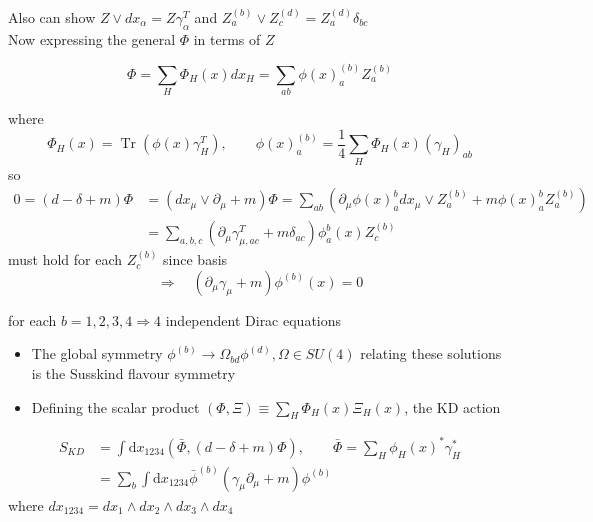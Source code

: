 Also can show \(Z \vee d x_{\alpha}=Z \gamma_{\alpha}^{T}\) and \(Z_{a}^{(b)} \vee Z_{c}^{(d)}=Z_{a}^{(d)} \delta_{b c}\)\\
Now expressing the general \(\Phi\) in terms of \(Z\)

\begin{equation}
\Phi=\sum_{H} \Phi_{H}(x) d x_{H}=\sum_{a b} \phi(x)_{a}^{(b)} Z_{a}^{(b)}
\end{equation}

where
\begin{equation}
    \Phi_{H}(x)=\operatorname{Tr}\left(\phi(x) \gamma_{H}^{T}\right), \qquad \phi(x)_{a}^{(b)}=\frac{1}{4} \sum_{H} \Phi_{H}(x)\left(\gamma_{H}\right)_{a b}
\end{equation}
so
\begin{align}
    0 = (d - \delta + m)\Phi &= (dx_\mu \vee \partial_\mu + m) \Phi = \sum_{ab}(\partial_\mu \phi(x)_a^b dx_\mu \vee Z_a^{(b)} + m \phi(x)_a^b Z_a^{(b)}) \nonumber \\
    &= \sum_{a,b,c}(\partial_\mu \gamma_{\mu,ac}^T + m \delta_{ac})\phi_a^b(x)Z_c^{(b)}
\end{align}
must hold for each $Z_c^{(b)}$ since basis
\begin{equation}
\Rightarrow \quad\left(\partial_{\mu} \gamma_{\mu}+m\right) \phi^{(b)}(x)=0
\end{equation}

for each \(b=1,2,3,4 \Rightarrow 4\) independent Dirac equations

\begin{itemize}
  \item The global symmetry $\phi^{(b)}\rightarrow \Omega_{bd}\phi^{(d)}, \Omega \in SU(4)$ relating these solutions is the Susskind flavour symmetry
  \item Defining the scalar product $(\Phi, \Xi) \equiv \sum_H \Phi_H(x)\Xi_H(x)$, the KD action
\end{itemize}
\begin{align}
    S_{KD} &= \int \text{d}x_{1234}(\bar{\Phi}, (d - \delta + m)\Phi), \qquad \bar{\Phi} = \sum_H \phi_H(x)^*\gamma_H^* \nonumber \\
    &= \sum_b \int \text{d}x_{1234}\bar{\phi}^{(b)}(\gamma_\mu \partial_\mu + m)\phi^{(b)}
\end{align}
where $dx_{1234}=dx_1\wedge dx_2\wedge dx_3 \wedge dx_4$

